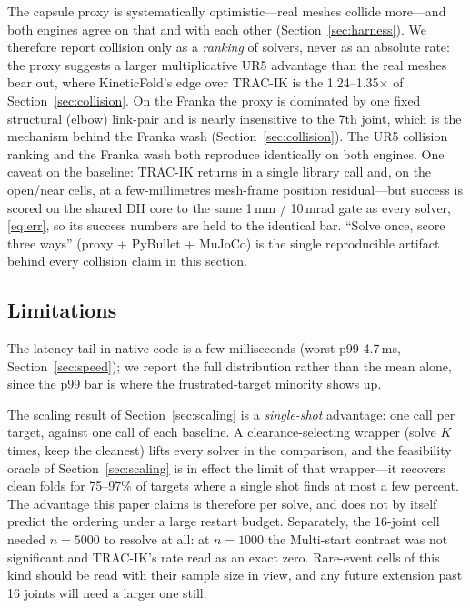 \documentclass[10pt,conference]{IEEEtran}
\begin{document}
The capsule proxy is systematically optimistic---real meshes collide more---and
both engines agree on that and with each other (Section~\ref{sec:harness}). We
therefore report collision only as a \emph{ranking} of solvers, never as an
absolute rate: the proxy suggests a larger multiplicative UR5 advantage than the
real meshes bear out, where KineticFold's edge over TRAC-IK is the
1.24--1.35$\times$ of Section~\ref{sec:collision}. On the Franka the proxy is
dominated by one fixed structural (elbow) link-pair and is nearly insensitive to
the 7th joint, which is the mechanism behind the Franka wash
(Section~\ref{sec:collision}). The UR5 collision ranking and the Franka wash both
reproduce identically on both engines. One caveat on the baseline: TRAC-IK
returns in a single library call and, on the open/near cells, at a
few-millimetres mesh-frame position residual---but success is scored on the
shared DH core to the same 1\,mm / 10\,mrad gate as every solver,
\eqref{eq:err}, so its success numbers are held to the identical bar. ``Solve
once, score three ways'' (proxy + PyBullet + MuJoCo) is the single reproducible
artifact behind every collision claim in this section.

\subsection{Limitations}
\label{sec:limitations}

The latency tail in native code is a few milliseconds (worst p99 4.7\,ms,
Section~\ref{sec:speed}); we report the full distribution rather than the mean
alone, since the p99 bar is where the frustrated-target minority shows up.

The scaling result of Section~\ref{sec:scaling} is a \emph{single-shot}
advantage: one call per target, against one call of each baseline. A
clearance-selecting wrapper (solve $K$ times, keep the cleanest) lifts every
solver in the comparison, and the feasibility oracle of
Section~\ref{sec:scaling} is in effect the limit of that wrapper---it recovers
clean folds for 75--97\% of targets where a single shot finds at most a few
percent. The advantage this paper claims is therefore per solve, and does not by
itself predict the ordering under a large restart budget. Separately, the
16-joint cell needed $n = 5000$ to resolve at all: at $n = 1000$ the Multi-start
contrast was not significant and TRAC-IK's rate read as an exact zero. Rare-event
cells of this kind should be read with their sample size in view, and any future
extension past 16 joints will need a larger one still.
\end{document}
